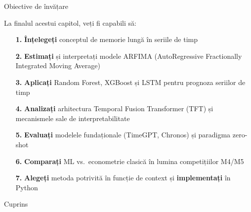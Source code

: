 \documentclass[9pt, aspectratio=169, t]{beamer}
\subtitle{Capitolul 8: Extensii Moderne}
\begin{document}
{
\begin{frame}
    \titlepage
\end{frame}
}

\begin{frame}{Obiective de învățare}
    \begin{cminipage}{0.95\textwidth}
        \begin{block}{La finalul acestui capitol, veți fi capabili să:}
            \begin{itemize}\setlength{\itemsep}{2pt}
                \item[\textcolor{MainBlue}{\textbf{1.}}] \textbf{Înțelegeți} conceptul de memorie lungă în seriile de timp
                \item[\textcolor{MainBlue}{\textbf{2.}}] \textbf{Estimați} și interpretați modele ARFIMA (AutoRegressive Fractionally Integrated Moving Average)
                \item[\textcolor{MainBlue}{\textbf{3.}}] \textbf{Aplicați} Random Forest, XGBoost și LSTM pentru prognoza seriilor de timp
                \item[\textcolor{MainBlue}{\textbf{4.}}] \textbf{Analizați} arhitectura Temporal Fusion Transformer (TFT) și mecanismele sale de interpretabilitate
                \item[\textcolor{MainBlue}{\textbf{5.}}] \textbf{Evaluați} modelele fundaționale (TimeGPT, Chronos) și paradigma zero-shot
                \item[\textcolor{MainBlue}{\textbf{6.}}] \textbf{Comparați} ML vs.\ econometrie clasică în lumina competițiilor M4/M5
                \item[\textcolor{MainBlue}{\textbf{7.}}] \textbf{Alegeți} metoda potrivită în funcție de context și \textbf{implementați} în Python
            \end{itemize}
        \end{block}
    \end{cminipage}
\end{frame}

\begin{frame}{Cuprins}
    \tableofcontents
\end{frame}
\end{document}
